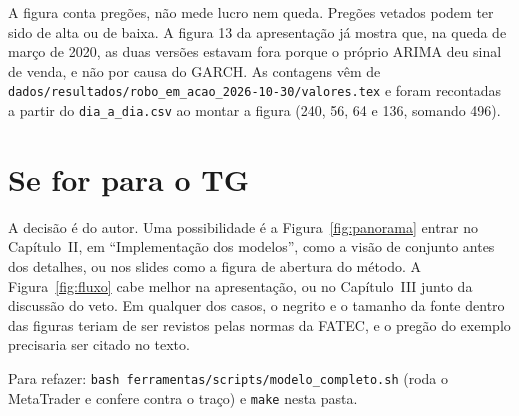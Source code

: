 \documentclass[11pt,a4paper]{article}
\begin{document}
\begin{cuidado}
A figura conta pregões, não mede lucro nem queda. Pregões vetados podem ter sido de alta ou de baixa. A figura 13 da
apresentação já mostra que, na queda de março de 2020, as duas versões estavam fora porque o próprio ARIMA deu sinal de
venda, e não por causa do GARCH. As contagens vêm de \texttt{dados/resultados/robo\_em\_acao\_2026-10-30/valores.tex}
e foram recontadas a partir do \texttt{dia\_a\_dia.csv} ao montar a figura (240, 56, 64 e 136, somando 496).
\end{cuidado}

\section{Se for para o TG}

A decisão é do autor. Uma possibilidade é a Figura~\ref{fig:panorama} entrar no Capítulo~II, em ``Implementação dos
modelos'', como a visão de conjunto antes dos detalhes, ou nos slides como a figura de abertura do método. A
Figura~\ref{fig:fluxo} cabe melhor na apresentação, ou no Capítulo~III junto da discussão do veto. Em qualquer dos
casos, o negrito e o tamanho da fonte dentro das figuras teriam de ser revistos pelas normas da FATEC, e o pregão do
exemplo precisaria ser citado no texto.

Para refazer: \texttt{bash ferramentas/scripts/modelo\_completo.sh} (roda o MetaTrader e confere contra o traço) e
\texttt{make} nesta pasta.
\end{document}
